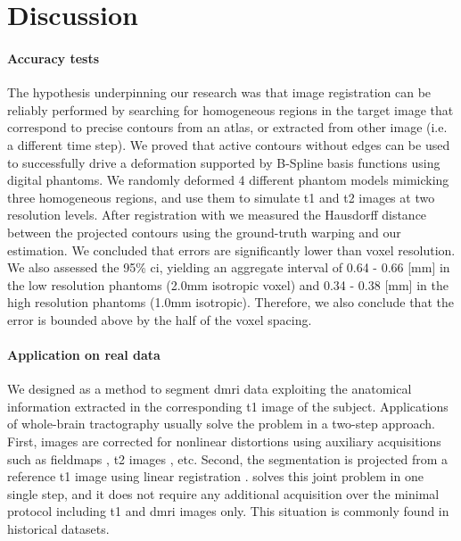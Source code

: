 \section{Discussion}
\label{sec:discussion}

\paragraph*{Accuracy tests}
The hypothesis underpinning our research was that image registration can be reliably performed
  by searching for homogeneous regions in the target image that correspond to precise contours
  from an atlas, or extracted from other image (i.e. a different time step).
We proved that active contours without edges can be used to successfully drive a
  deformation supported by B-Spline basis functions using digital phantoms.
We randomly deformed 4 different phantom models mimicking three homogeneous regions,
  and use them to simulate \gls*{t1} and \gls*{t2} images at two resolution levels.
After registration with \regseg{} we measured the Hausdorff distance between the
  projected contours using the ground-truth warping and our estimation.
We concluded that errors are significantly lower than voxel resolution.
We also assessed the 95\% \gls*{ci}, yielding an aggregate interval of
  0.64 - 0.66 [mm] in the low resolution phantoms (2.0mm isotropic voxel) and
  0.34 - 0.38 [mm] in the high resolution phantoms (1.0mm isotropic).
Therefore, we also conclude that the error is bounded above by the half of the
  voxel spacing.

\paragraph*{Application on real data}
We designed \regseg{} as a method to segment \gls*{dmri} data exploiting the
  anatomical information extracted in the corresponding \gls*{t1} image of the subject.
Applications of whole-brain tractography \citep{smith_tractbased_2006,craddock_imaging_2013}
  usually solve the problem in a two-step approach.
First, images are corrected for nonlinear distortions using auxiliary acquisitions
  such as fieldmaps \citep{jezzard_correction_1995}, \gls*{t2} images \citep{kybic_unwarping_2000},
  etc.
Second, the segmentation is projected from a reference \gls*{t1} image using linear
  registration \citep{greve_accurate_2009}.
\Regseg{} solves this joint problem in one single step, and it does not require any additional
  acquisition over the minimal protocol including \gls*{t1} and \gls*{dmri} images only.
This situation is commonly found in historical datasets.

